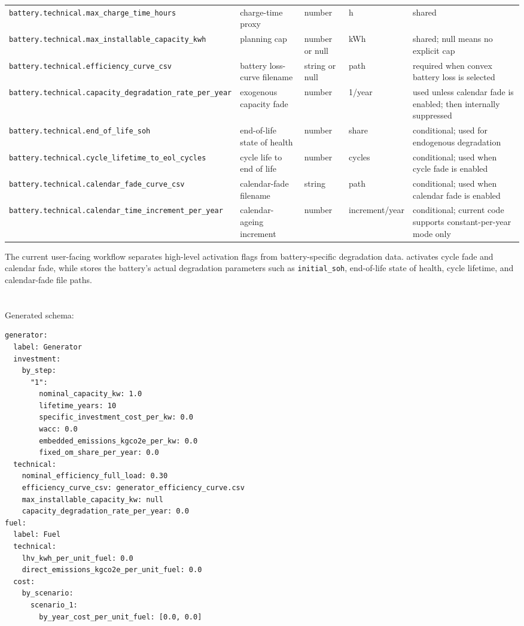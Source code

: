 \documentclass[11pt,a4paper]{report}
\newcommand{\code}[1]{\texttt{#1}}
\begin{document}
\begin{longtable}{p{}p{}p{}p{}p{}}
\code{battery.technical.max\_charge\_time\_hours} & charge-time proxy & number & h & shared \\
\code{battery.technical.max\_installable\_capacity\_kwh} & planning cap & number or null & kWh & shared; null means no explicit cap \\
\code{battery.technical.efficiency\_curve\_csv} & battery loss-curve filename & string or null & path & required when convex battery loss is selected \\
\code{battery.technical.capacity\_degradation\_rate\_per\_year} & exogenous capacity fade & number & 1/year & used unless calendar fade is enabled; then internally suppressed \\
\code{battery.technical.end\_of\_life\_soh} & end-of-life state of health & number & share & conditional; used for endogenous degradation \\
\code{battery.technical.cycle\_lifetime\_to\_eol\_cycles} & cycle life to end of life & number & cycles & conditional; used when cycle fade is enabled \\
\code{battery.technical.calendar\_fade\_curve\_csv} & calendar-fade filename & string & path & conditional; used when calendar fade is enabled \\
\code{battery.technical.calendar\_time\_increment\_per\_year} & calendar-ageing increment & number & increment/year & conditional; current code supports constant-per-year mode only \\
\bottomrule
\end{longtable}

\begin{guidenote}
The current user-facing workflow separates high-level activation flags from battery-specific degradation data.  activates cycle fade and calendar fade, while  stores the battery's actual degradation parameters such as \code{initial\_soh}, end-of-life state of health, cycle lifetime, and calendar-fade file paths.
\end{guidenote}

\section{}

Generated schema:

\begin{lstlisting}[style=mgpy]
generator:
  label: Generator
  investment:
    by_step:
      "1":
        nominal_capacity_kw: 1.0
        lifetime_years: 10
        specific_investment_cost_per_kw: 0.0
        wacc: 0.0
        embedded_emissions_kgco2e_per_kw: 0.0
        fixed_om_share_per_year: 0.0
  technical:
    nominal_efficiency_full_load: 0.30
    efficiency_curve_csv: generator_efficiency_curve.csv
    max_installable_capacity_kw: null
    capacity_degradation_rate_per_year: 0.0
fuel:
  label: Fuel
  technical:
    lhv_kwh_per_unit_fuel: 0.0
    direct_emissions_kgco2e_per_unit_fuel: 0.0
  cost:
    by_scenario:
      scenario_1:
        by_year_cost_per_unit_fuel: [0.0, 0.0]
\end{lstlisting}
\end{document}

